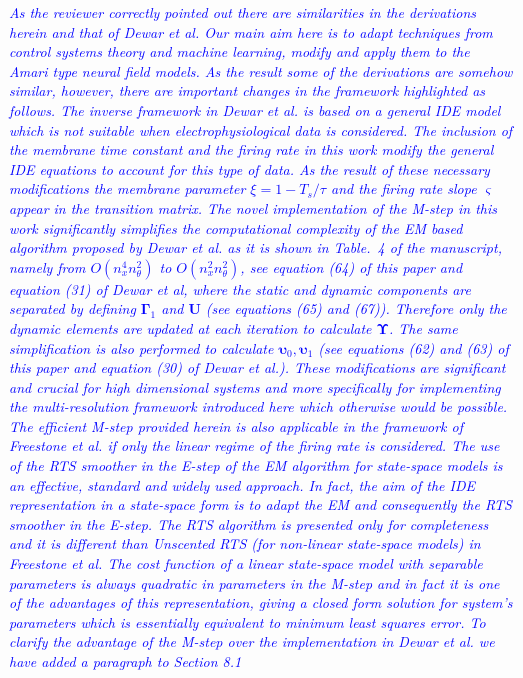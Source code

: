 \documentclass{article}
\newcommand{\parham}[1]{\textcolor{blue}{#1}}
\begin{document}
\begin{enumerate}
		\emph{\parham{As the reviewer correctly pointed out there are similarities in the derivations herein and that of Dewar et al. Our main aim here is to adapt techniques from control systems theory and machine learning, modify and apply them to the Amari type neural field models. As the result some of the derivations are somehow similar, however, there are important changes in the framework highlighted as follows. The inverse framework in Dewar et al. is based on a general IDE model which is not suitable when electrophysiological data is considered.  The inclusion of the membrane time constant and the firing rate in this work modify the general IDE equations to account for this type of data. As the result of these necessary modifications  the membrane parameter $\xi=1-T_s/\tau$ and the firing rate slope $\varsigma$ appear in the transition matrix. The novel implementation of the M-step in this work significantly simplifies the computational complexity of the EM based algorithm proposed by Dewar et al. as it is shown in Table.~4 of the manuscript, namely from $O(n_x^4n_{\theta}^2)$ to $O(n_x^2n_{\theta}^2)$, see equation (64) of this paper and equation (31) of Dewar et al, where the static and dynamic components are separated by defining $\boldsymbol \Gamma_1$ and $\mathbf U$ (see equations (65) and (67)). Therefore only the dynamic elements are updated at each iteration  to calculate $\boldsymbol\Upsilon$. The same simplification is also performed to calculate $\boldsymbol\upsilon_0, \boldsymbol\upsilon_1$ (see equations (62) and (63) of this paper and equation (30) of Dewar et al.). These modifications are significant and crucial for high dimensional systems and more specifically for implementing the multi-resolution framework introduced here which otherwise would be possible. The efficient M-step provided herein is also applicable in the framework of Freestone et al. if only the linear regime of the firing rate is considered.  The use of the RTS smoother in the E-step of the EM algorithm for state-space models is an effective, standard and widely used approach. In fact, the aim of the IDE representation in a state-space form is to adapt the EM and consequently the RTS smoother in the E-step. The RTS algorithm is presented only for completeness and it is different than Unscented RTS (for non-linear state-space models) in Freestone et al. The cost function of a linear state-space model with separable parameters is always quadratic in parameters in the M-step and in fact it is one of the advantages of this representation, giving a closed form solution for system's parameters which is essentially equivalent to minimum least squares error. To clarify the advantage of the M-step over the implementation in Dewar et al. we have added a paragraph to Section 8.1}}
		

\end{enumerate}
\end{document}
